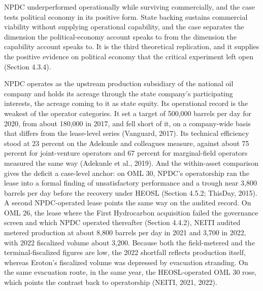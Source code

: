 NPDC underperformed operationally while surviving commercially, and the
case tests political economy in its positive form. State backing
sustains commercial viability without supplying operational capability,
and the case separates the dimension the political-economy account
speaks to from the dimension the capability account speaks to. It is the
third theoretical replication, and it supplies the positive evidence on
political economy that the critical experiment left open (Section
4.3.4).

NPDC operates as the upstream production subsidiary of the national oil
company and holds its acreage through the state company's participating
interests, the acreage coming to it as state equity. Its operational
record is the weakest of the operator categories. It set a target of
500,000 barrels per day for 2020, from about 180,000 in 2017, and fell
short of it, on a company-wide basis that differs from the lease-level
series (Vanguard, 2017). Its technical efficiency stood at 23 percent on
the Adekunle and colleagues measure, against about 75 percent for
joint-venture operators and 67 percent for marginal-field operators
measured the same way (Adekunle et al., 2019). And the within-asset
comparison gives the deficit a case-level anchor: on OML 30, NPDC's
operatorship ran the lease into a formal finding of unsatisfactory
performance and a trough near 3,800 barrels per day before the recovery
under HEOSL (Section 4.5.2; ThisDay, 2015). A second NPDC-operated lease
points the same way on the audited record. On OML 26, the lease where
the First Hydrocarbon acquisition failed the governance screen and which
NPDC operated thereafter (Section 4.4.2), NEITI audited metered
production at about 8,800 barrels per day in 2021 and 3,700 in 2022,
with 2022 fiscalized volume about 3,200. Because both the field-metered
and the terminal-fiscalized figures are low, the 2022 shortfall reflects
production itself, whereas Eroton's fiscalized volume was depressed by
evacuation stranding. On the same evacuation route, in the same year,
the HEOSL-operated OML 30 rose, which points the contrast back to
operatorship (NEITI, 2021, 2022).

